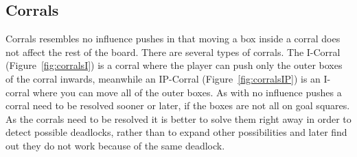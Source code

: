 \documentclass[a4paper,11pt]{article}
\renewcommand{\*}[0]{\cdot}
\begin{document}
\subsection{Corrals}

Corrals resembles no influence pushes in that moving a box inside a corral does
not affect the rest of the board.  There are several types of corrals. The
I-Corral (Figure~\ref{fig:corralsI}) is a corral where the player can push only
the outer boxes of the corral inwards, meanwhile an IP-Corral
(Figure~\ref{fig:corralsIP}) is an I-corral where you can move all of the outer
boxes. As with no influence pushes a corral need to be resolved sooner or later,
if the boxes are not all on goal squares.  As the corrals need to be resolved it
is better to solve them right away in order to detect possible deadlocks, rather
than to expand other possibilities and later find out they do not work because
of the same deadlock.


\end{document}
